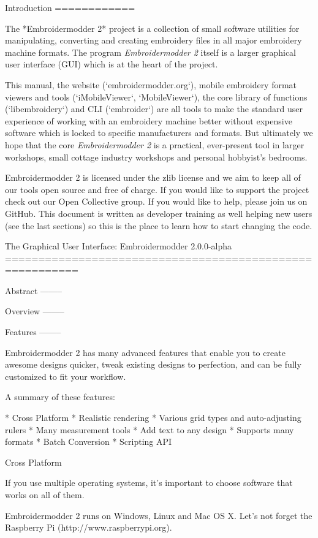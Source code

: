 \documentclass[a4paper]{report}
\begin{document}
{Introduction
============

The *Embroidermodder 2* project is a collection of small software utilities for
manipulating, converting and creating embroidery files in all major embroidery
machine formats. The program \textit{Embroidermodder 2} itself is a larger graphical
user interface (GUI) which is at the heart of the project.

This manual, the website (`embroidermodder.org`), mobile embroidery format viewers
and tools (`iMobileViewer`, `MobileViewer`), the core library of functions
(`libembroidery`) and CLI (`embroider`) are all tools to make the standard
user experience of working with an embroidery machine better without expensive
software which is locked to specific manufacturers and formats. But ultimately
we hope that the core \textit{Embroidermodder 2} is a practical, ever-present tool in
larger workshops, small cottage industry workshops and personal hobbyist's
bedrooms.

Embroidermodder 2 is licensed under the zlib license and we aim to keep all of
our tools open source and free of charge. If you would like to support the
project check out our Open Collective group. If you would like to help, please
join us on GitHub. This document is written as developer training as well
helping new users (see the last sections) so this is the place to learn how
to start changing the code.

The Graphical User Interface: Embroidermodder 2.0.0-alpha
=========================================================

Abstract
--------

Overview
--------

Features
--------

Embroidermodder 2 has many advanced features that enable you to create awesome designs quicker, tweak existing designs to perfection, and can be fully customized to fit your workflow.

A summary of these features:

* Cross Platform
* Realistic rendering
* Various grid types and auto-adjusting rulers
* Many measurement tools
* Add text to any design
* Supports many formats
* Batch Conversion
* Scripting API

Cross Platform
~~~~~~~~~~~~~~

If you use multiple operating systems, it's important to choose software that works on all of them.

Embroidermodder 2 runs on Windows, Linux and Mac OS X. Let's not forget the Raspberry Pi (http://www.raspberrypi.org).

}
\end{document}
